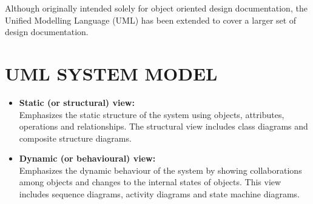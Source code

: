 \documentclass[12pt]{extreport}
\begin{document}
\noindent
Although originally intended solely for object oriented design documentation, the Unified Modelling Language (UML) has been extended to cover a larger set of design documentation.


\section{UML SYSTEM MODEL}
\begin{itemize}
\item \textbf{Static (or structural) view:}\\
Emphasizes the static structure of the system using objects, attributes,
operations and relationships. The structural view includes class diagrams and composite structure
diagrams.
\item \textbf{Dynamic (or behavioural) view:}\\
Emphasizes the dynamic behaviour of the system by showing collaborations among objects and changes to the internal states of objects. This view includes sequence diagrams, activity diagrams and state machine diagrams.
\end{itemize}
\end{document}
